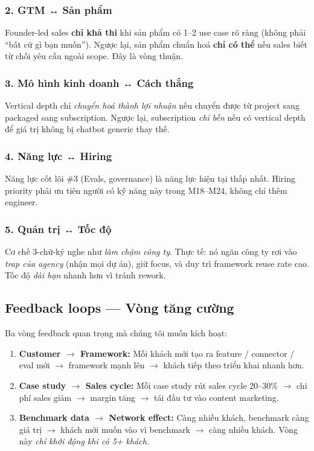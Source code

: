\documentclass[11pt,a4paper]{article}
\begin{document}
\subsubsection*{2. GTM ↔ Sản phẩm}

Founder-led sales \textbf{chỉ khả thi} khi sản phẩm có 1--2 use case rõ ràng (không
phải ``bất cứ gì bạn muốn''). Ngược lại, sản phẩm chuẩn hoá \textbf{chỉ có thể}
nếu sales biết từ chối yêu cầu ngoài scope. Đây là vòng thuận.

\subsubsection*{3. Mô hình kinh doanh ↔ Cách thắng}

Vertical depth chỉ \textit{chuyển hoá thành lợi nhuận} nếu chuyển được từ project
sang packaged sang subscription. Ngược lại, subscription \textit{chỉ bền} nếu
có vertical depth để giá trị không bị chatbot generic thay thế.

\subsubsection*{4. Năng lực ↔ Hiring}

Năng lực cốt lõi \#3 (Evals, governance) là năng lực hiện tại thấp nhất. Hiring
priority phải ưu tiên người có kỹ năng này trong M18--M24, không chỉ thêm
engineer.

\subsubsection*{5. Quản trị ↔ Tốc độ}

Cơ chế 3-chữ-ký nghe như \textit{làm chậm công ty}. Thực tế: nó ngăn công ty
rơi vào \textit{trap của agency} (nhận mọi dự án), giữ focus, và duy trì
framework reuse rate cao. Tốc độ \textit{dài hạn} nhanh hơn vì tránh rework.

\subsection{Feedback loops --- Vòng tăng cường}

Ba vòng feedback quan trọng mà chúng tôi muốn kích hoạt:

\begin{enumerate}
\item \textbf{Customer $\to$ Framework:} Mỗi khách mới tạo ra feature / connector / eval mới $\to$ framework mạnh lên $\to$ khách tiếp theo triển khai nhanh hơn.

\item \textbf{Case study $\to$ Sales cycle:} Mỗi case study rút sales cycle 20--30\% $\to$ chi phí sales giảm $\to$ margin tăng $\to$ tái đầu tư vào content marketing.

\item \textbf{Benchmark data $\to$ Network effect:} Càng nhiều khách, benchmark càng giá trị $\to$ khách mới muốn vào vì benchmark $\to$ càng nhiều khách. Vòng này \textit{chỉ khởi động khi có 5+ khách}.
\end{enumerate}
\end{document}
